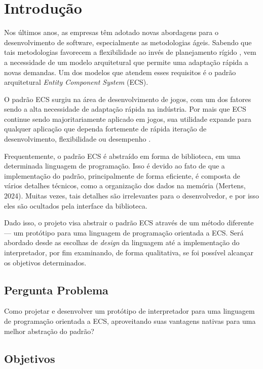 \chapter{Introdução}\label{ch:introducao}

Nos últimos anos, as empresas têm adotado novas abordagens para o desenvolvimento de software, especialmente as metodologias ágeis. Sabendo que tais metodologias favorecem a flexibilidade ao invés de planejamento rígido \cite{agile}, vem a necessidade de um modelo arquitetural que permite uma adaptação rápida a novas demandas. Um dos modelos que atendem esses requisitos é o padrão arquitetural \textit{Entity Component System} (ECS).

O padrão ECS surgiu na área de desenvolvimento de jogos, com um dos fatores sendo a alta necessidade de adaptação rápida na indústria. Por mais que ECS continue sendo majoritariamente aplicado em jogos, sua utilidade expande para qualquer aplicação que dependa fortemente de rápida iteração de desenvolvimento, flexibilidade ou desempenho \cite{flightdynamics}.

Frequentemente, o padrão ECS é abstraído em forma de biblioteca, em uma determinada linguagem de programação. Isso é devido ao fato de que a implementação do padrão, principalmente de forma eficiente, é composta de vários detalhes técnicos, como a organização dos dados na memória (Mertens, 2024). Muitas vezes, tais detalhes são irrelevantes para o desenvolvedor, e por isso eles são ocultados pela interface da biblioteca.

Dado isso, o projeto visa abstrair o padrão ECS através de um método diferente — um protótipo para uma linguagem de programação orientada a ECS. Será abordado desde as escolhas de \textit{design} da linguagem até a implementação do interpretador, por fim examinando, de forma qualitativa, se foi possível alcançar os objetivos determinados.

\section{Pergunta Problema}

Como projetar e desenvolver um protótipo de interpretador para uma linguagem de programação orientada a ECS, aproveitando suas vantagens nativas para uma melhor abstração do padrão?

\section{Objetivos}

